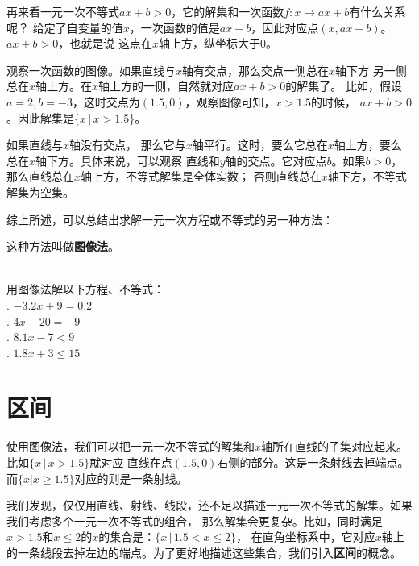 \documentclass[12pt,UTF8,fontset=none]{ctexbook}
\begin{document}
再来看一元一次不等式$ax + b > 0$，它的解集和一次函数$f:x\mapsto ax + b$有什么关系呢？
给定了自变量的值$x$，一次函数的值是$ax + b$，因此对应点$(x, ax + b)$。$ax + b > 0$，也就是说
这点在$x$轴上方，纵坐标大于$0$。

观察一次函数的图像。如果直线与$x$轴有交点，那么交点一侧总在$x$轴下方
另一侧总在$x$轴上方。在$x$轴上方的一侧，自然就对应$ax + b > 0$的解集了。
比如，假设$a = 2, b = -3$，这时交点为$(1.5, 0)$，观察图像可知，$x > 1.5$的时候，
$ax + b > 0$。因此解集是$\{x \, | \, x > 1.5\}$。

如果直线与$x$轴没有交点，
那么它与$x$轴平行。这时，要么它总在$x$轴上方，要么总在$x$轴下方。具体来说，可以观察
直线和$y$轴的交点。它对应点$b$。如果$b>0$，那么直线总在$x$轴上方，不等式解集是全体实数；
否则直线总在$x$轴下方，不等式解集为空集。

综上所述，可以总结出求解一元一次方程或不等式的另一种方法：
\begin{center}
\end{center}

这种方法叫做\textbf{图像法}。

\begin{xt}\label{xt:5-3-0}
    \mbox{}\\
    用图像法解以下方程、不等式：\\
    . $-3.2x + 9 = 0.2$\\
    . $4x - 20 = -9$\\
    . $8.1x -7 < 9$\\
    . $1.8x + 3 \leqslant 15$
\end{xt}

\section{区间}
使用图像法，我们可以把一元一次不等式的解集和$x$轴所在直线的子集对应起来。比如$\{x \, | \, x > 1.5\}$就对应
直线在点$(1.5, 0)$右侧的部分。这是一条射线去掉端点。而$\{x | x \geqslant 1.5\}$对应的则是一条射线。

我们发现，仅仅用直线、射线、线段，还不足以描述一元一次不等式的解集。如果我们考虑多个一元一次不等式的组合，
那么解集会更复杂。比如，同时满足$x > 1.5$和$x \leqslant 2$的$x$的集合是：$\{x \, | \, 1.5 < x \leqslant 2\}$，
在直角坐标系中，它对应$x$轴上的一条线段去掉左边的端点。为了更好地描述这些集合，我们引入\textbf{区间}的概念。
\end{document}
